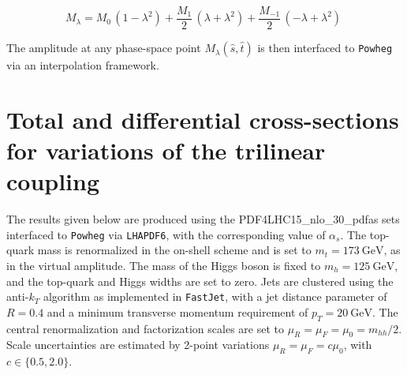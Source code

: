 \documentclass[a4paper]{jpconf}
\newcommand{\GeV}{\ensuremath{\mathrm{\:GeV}}}
\begin{document}
\begin{equation}
M_{\lambda} =M_0\,(1-\lambda^2)+\frac{M_1}{2}\,(\lambda+\lambda^2) + \frac{M_{-1}}{2}\,(-\lambda+\lambda^2)\;
\end{equation}

The amplitude at any phase-space point $M_{\lambda}(\hat{s}, \hat{t})$ is then interfaced to \texttt{Powheg} via an interpolation framework. 


\section{Total and differential cross-sections for variations of the trilinear coupling}

The results given below are produced using the PDF4LHC15\_nlo\_30\_pdfas sets interfaced to \texttt{Powheg} via \texttt{LHAPDF6}, with the corresponding value of $\alpha_s$. The top-quark mass is renormalized in the on-shell scheme and is set to $m_t=173 \GeV$, as in the virtual amplitude. The mass of the Higgs boson is fixed to $m_h=125 \GeV$, and the top-quark and Higgs widths are set to zero. Jets are clustered using the anti-$k_T$ algorithm as implemented in \texttt{FastJet}, with a jet distance parameter of $R=0.4$ and a minimum transverse momentum requirement of $p_{T} = 20 \GeV$. The central renormalization and factorization scales are set to $\mu_R = \mu_F = \mu_0 = m_{hh} / 2$. Scale uncertainties are estimated by 2-point variations $\mu_R = \mu_F = c \mu_0$, with $c \in \lbrace {0.5, 2.0} \rbrace$.
\end{document}
